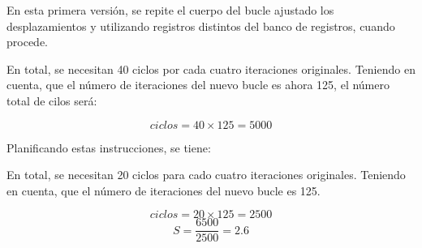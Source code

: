 

En esta primera versión, se repite el cuerpo del bucle ajustado los
desplazamientos y utilizando registros distintos del banco de registros,
cuando procede.

En total, se necesitan 40 ciclos por cada cuatro iteraciones originales.
Teniendo en cuenta, que el número de iteraciones del nuevo bucle es ahora 125,
el número total de cilos será:

\[
ciclos = 40 \times 125 = 5000
\]

Planificando estas instrucciones, se tiene:



En total, se necesitan 20 ciclos para cado cuatro iteraciones originales.
Teniendo en cuenta, que el número de iteraciones del nuevo bucle es 125.

\[
ciclos = 20 \times 125 = 2500
\]
\[
S = \frac{6500}{2500} = 2.6
\]
